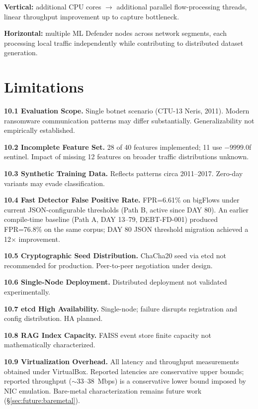 \documentclass[11pt,a4paper]{article}
\begin{document}
    \textbf{Vertical:} additional CPU cores $\to$ additional parallel flow-processing threads,
    linear throughput improvement up to capture bottleneck.

    \textbf{Horizontal:} multiple ML Defender nodes across network segments, each processing
    local traffic independently while contributing to distributed dataset generation.

    \section{Limitations}
    \label{sec:limitations}

    \textbf{10.1 Evaluation Scope.} Single botnet scenario (CTU-13 Neris, 2011). Modern
    ransomware communication patterns may differ substantially. Generalizability not empirically
    established.

    \textbf{10.2 Incomplete Feature Set.} 28 of 40 features implemented; 11 use $-9999.0$f
    sentinel. Impact of missing 12 features on broader traffic distributions unknown.

    \textbf{10.3 Synthetic Training Data.} Reflects patterns circa 2011--2017. Zero-day
    variants may evade classification.

    \textbf{10.4 Fast Detector False Positive Rate.} FPR=6.61\% on bigFlows under current
    JSON-configurable thresholds (Path B, active since DAY 80). An earlier compile-time baseline
    (Path A, DAY 13--79, DEBT-FD-001) produced FPR=76.8\% on the same corpus; DAY 80 JSON
    threshold migration achieved a 12$\times$ improvement.

    \textbf{10.5 Cryptographic Seed Distribution.} ChaCha20 seed via etcd not recommended for
    production. Peer-to-peer negotiation under design.

    \textbf{10.6 Single-Node Deployment.} Distributed deployment not validated
    experimentally.

    \textbf{10.7 etcd High Availability.} Single-node; failure disrupts registration and config
    distribution. HA planned.

    \textbf{10.8 RAG Index Capacity.} FAISS event store finite capacity not mathematically
    characterized.

    \textbf{10.9 Virtualization Overhead.} All latency and throughput measurements obtained
    under VirtualBox. Reported latencies are conservative upper bounds; reported throughput
    (${\sim}$33--38~Mbps) is a conservative lower bound imposed by NIC emulation. Bare-metal
    characterization remains future work (\S\ref{sec:future:baremetal}).
\end{document}
